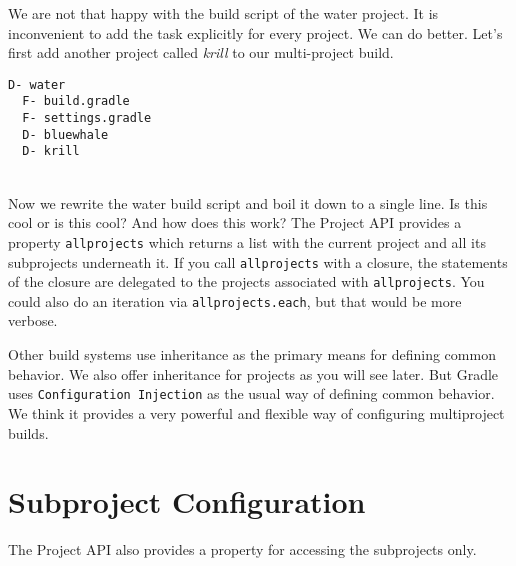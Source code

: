 We are not that happy with the build script of the water project. It is inconvenient to add the task explicitly for every project. We can do better. Let's first add another project called \emph{krill} to our multi-project build.

\begin{minipage}[t]{7cm}
\begin{Verbatim}[frame=single,label=Project Tree]
D- water
  F- build.gradle
  F- settings.gradle
  D- bluewhale
  D- krill	
\end{Verbatim}
\end{minipage}	
\begin{minipage}[t]{9cm}
\end{minipage}
\\

\noindent Now we rewrite the water build script and boil it down to a single line.
Is this cool or is this cool? And how does this work? The Project API provides a property \texttt{allprojects} which returns a list with the current project and all its subprojects underneath it. If you call \texttt{allprojects} with a closure, the statements of the closure are delegated to the projects associated with \texttt{allprojects}. You could also do an iteration via \texttt{allprojects.each}, but that would be more verbose.
\\

\begin{graybox}
Other build systems use inheritance as the primary means for defining common behavior. We also offer inheritance for projects as you will see later. But Gradle uses \texttt{Configuration Injection} as the usual way of defining common behavior. We think it provides a very powerful and flexible way of configuring multiproject builds.	
\end{graybox}

\section{Subproject Configuration} %
\label{sec:subproject_configuration}
\noindent The Project API also provides a property for accessing the subprojects only. 

